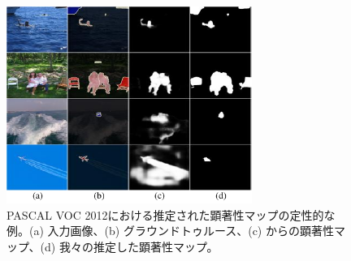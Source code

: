 \begin{figure}[t]
\centering
\includegraphics[width=8cm]{figures/fig_saliency_v2.pdf}
\caption{PASCAL VOC 2012における推定された顕著性マップの定性的な例。(a) 入力画像、(b) グラウンドトゥルース、(c) \cite{zhao2019pyramid}からの顕著性マップ、(d) 我々の推定した顕著性マップ。} \vspace{-2mm}
\label{fig:sal}
\end{figure}
